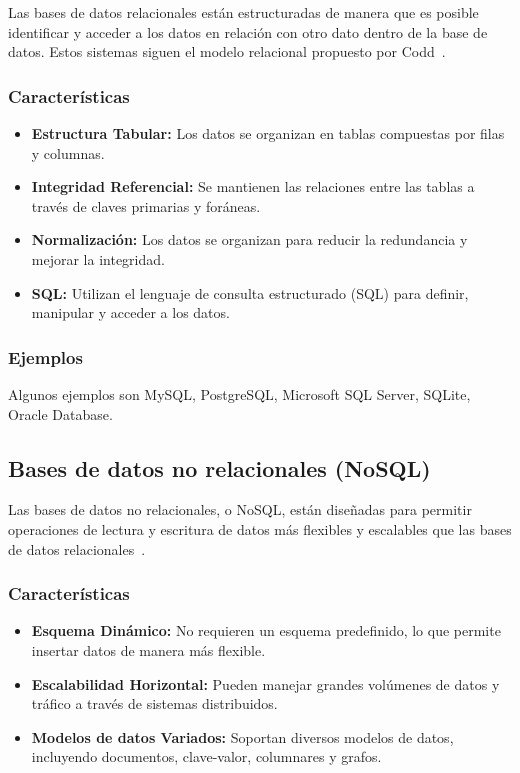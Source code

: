 Las bases de datos relacionales están estructuradas de manera que es posible identificar y acceder a los datos en relación con otro dato dentro de la base de datos. Estos sistemas siguen el modelo relacional propuesto por Codd~\cite{codd1970}.

\subsubsection{Características}
\begin{itemize}
\item \textbf{Estructura Tabular:} Los datos se organizan en tablas compuestas por filas y columnas.
\item \textbf{Integridad Referencial:} Se mantienen las relaciones entre las tablas a través de claves primarias y foráneas.
\item \textbf{Normalización:} Los datos se organizan para reducir la redundancia y mejorar la integridad.
\item \textbf{SQL:} Utilizan el lenguaje de consulta estructurado (SQL) para definir, manipular y acceder a los datos.
\end{itemize}

\subsubsection{Ejemplos}
Algunos ejemplos son MySQL, PostgreSQL, Microsoft SQL Server, SQLite, Oracle Database.

\subsection{Bases de datos no relacionales (NoSQL)}

Las bases de datos no relacionales, o NoSQL, están diseñadas para permitir operaciones de lectura y escritura de datos más flexibles y escalables que las bases de datos relacionales~\cite{garba2020}.

\subsubsection{Características}
\begin{itemize}
\item \textbf{Esquema Dinámico:} No requieren un esquema predefinido, lo que permite insertar datos de manera más flexible.
\item \textbf{Escalabilidad Horizontal:} Pueden manejar grandes volúmenes de datos y tráfico a través de sistemas distribuidos.
\item \textbf{Modelos de datos Variados:} Soportan diversos modelos de datos, incluyendo documentos, clave-valor, columnares y grafos.
\end{itemize}


